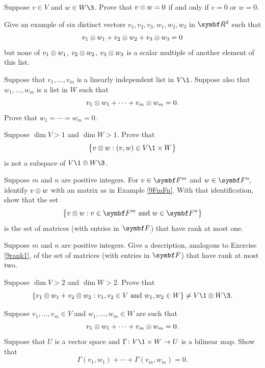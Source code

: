 \begin{exercises}

\exercise
Suppose $v \in V$ and $w \in W\3$. Prove that $v \otimes w = 0$ if and only if $v = 0$ or $w = 0$.\label{9zeroten}


\exercise
Give an example of six distinct vectors $v_1, v_2, v_3, w_1, w_2, w_3$ in $\R3$ such that
\[
v_1 \otimes w_1 + v_2 \otimes w_2 + v_3 \otimes w_3 = 0
\]
but none of $v_1 \otimes w_1$, $v_2 \otimes w_2$, $v_3 \otimes w_3$ is a scalar multiple of another element of this list.


\exercise
Suppose that $v_1, \ldots, v_m$ is a linearly independent list in $V\1$. Suppose also that $w_1, \ldots, w_m$ is a list in $W$ such that
\[
v_1 \otimes w_1 + \cdots + v_m \otimes w_m = 0.
\]
Prove that $w_1 = \cdots = w_m = 0$.


\exercise
Suppose $\dim V > 1$ and $\dim W > 1$. Prove that\label{9VtenW}
\[
\br[\big]{ v \tensor w : (v, w) \in V\1 \times W }
\]
is not a subspace of $V\1 \tensor W\3$.
\vspace{-10bp}


\exercise
Suppose $m$ and $n$ are positive integers. For $v \in \F m$ and $w \in \FF{n}$, identify $v \otimes w$ with an  matrix as in Example \ref{9FmFn}. With that identification, show that the set\label{9rank1}
\[
\br[\big]{ v \tensor w : v \in \F m \text{ and } w \in \F n }
\]
is the set of  matrices (with entries in $\F{}$) that have rank at most one.


\exercise
Suppose $m$ and $n$ are positive integers. Give a description, analogous to Exercise \ref{9rank1}, of the set of  matrices (with entries in $\F{}$) that have rank at most two.\label{9rank2}


\exercise
Suppose $\dim V > 2$ and $\dim W > 2$. Prove that
\[
\br{ v_1 \tensor w_1 + v_2 \tensor w_2 : v_1, v_2 \in V \text{ and } w_1, w_2 \in W } \ne V\1 \tensor W\3.
\]
\exercisedisplayend


\exercise
Suppose $v_1, \ldots, v_m \in V$ and $w_1, \ldots,w_m \in W$ are such that
\[
v_1 \otimes w_1 + \cdots + v_m \otimes w_m = 0.
\]
Suppose that $U$ is a vector space and $\fun \Gamma {V\1 \times W} U$ is a bilinear map.
Show that
\[
\Gamma(v_1, w_1) + \cdots + \Gamma(v_m, w_m) = 0.
\]
\exercisedisplayend



\end{exercises}

